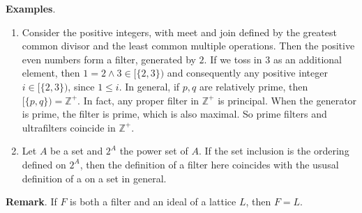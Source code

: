 \documentclass[12pt]{article}
\begin{document}
\textbf{Examples}.
\begin{enumerate}
\item Consider the positive integers, with meet and join defined by the greatest common divisor and the least common multiple operations.  Then the positive even numbers form a filter, generated by $2$.  If we toss in $3$ as an additional element, then $1=2\wedge 3\in[\lbrace 2,3\rbrace)$ and consequently any positive integer $i\in[\lbrace 2,3\rbrace)$, since $1\le i$.  In general, if $p,q$ are relatively prime, then $[\lbrace p,q\rbrace)=\mathbb{Z}^{+}$.  In fact, any proper filter in $\mathbb{Z}^{+}$ is principal.  When the generator is prime, the filter is prime, which is also maximal.  So prime filters and ultrafilters coincide in $\mathbb{Z}^{+}$.
\item Let $A$ be a set and $2^A$ the power set of $A$.  If the set inclusion is the ordering defined on $2^A$, then the definition of a filter here coincides with the ususal definition of a  on a set in general.
\end{enumerate}

\textbf{Remark}.  If $F$ is both a filter and an ideal of a lattice $L$, then $F=L$.
\end{document}

